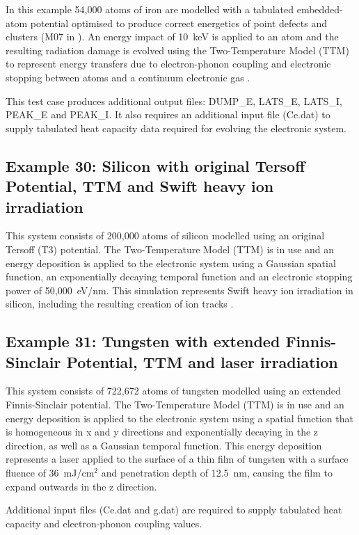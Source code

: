 In this example 54,000 atoms of iron are modelled with a tabulated
embedded-atom potential optimised to produce correct energetics of point
defects and clusters (M07 in \cite{malerba-10a}). An energy impact of 10~keV
is applied to an atom and the resulting radiation damage is evolved using the
Two-Temperature Model (TTM) to represent energy transfers due to
electron-phonon coupling and electronic stopping between atoms
and a continuum electronic gas \cite{zarkadoula-14a}.

This test case produces additional output files: DUMP\_E, LATS\_E,
LATS\_I, PEAK\_E and PEAK\_I. It also requires an additional input file
(Ce.dat) to supply tabulated heat capacity data required for evolving the
electronic system.

\subsection{Example 30: Silicon with original Tersoff Potential, TTM and Swift heavy ion irradiation}

This system consists of 200,000 atoms of silicon modelled using an
original Tersoff (T3) potential. The Two-Temperature Model (TTM) is
in use and an energy deposition is applied to the electronic system
using a Gaussian spatial function, an exponentially decaying temporal
function and an electronic stopping power of 50,000~eV/nm.
This simulation represents Swift heavy ion irradiation in silicon, including
the resulting creation of ion tracks \cite{khara-16a}.

\subsection{Example 31: Tungsten with extended Finnis-Sinclair Potential, TTM and laser irradiation}

This system consists of 722,672 atoms of tungsten modelled using an
extended Finnis-Sinclair potential. The Two-Temperature Model (TTM)
is in use and an energy deposition is applied to the electronic system
using a spatial function that is homogeneous in x and y directions and
exponentially decaying in the z direction, as well as a Gaussian
temporal function. This energy deposition represents a laser applied to
the surface of a thin film of tungsten \cite{murphy-15a} with a surface
fluence of 36~mJ/cm$^2$ and penetration depth of 12.5~nm, causing
the film to expand outwards in the z direction.

Additional input files (Ce.dat and g.dat) are required to supply tabulated
heat capacity and electron-phonon coupling values.

